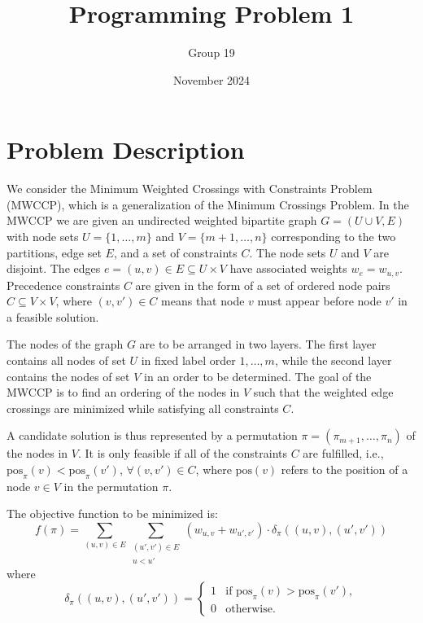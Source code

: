 \documentclass{article}
\title{Programming Problem 1}
\author{Group 19}
\date{November 2024}
\begin{document}
\maketitle

\section*{Problem Description}
We consider the Minimum Weighted Crossings with Constraints Problem (MWCCP), which is a generalization of the Minimum Crossings Problem. In the MWCCP we are given an undirected weighted bipartite graph \( G = (U \cup V, E) \) with node sets \( U = \{1, \dots, m\} \) and \( V = \{m + 1, \dots, n\} \) corresponding to the two partitions, edge set \( E \), and a set of constraints \( C \). The node sets \( U \) and \( V \) are disjoint. The edges \( e = (u, v) \in E \subseteq U \times V \) have associated weights \( w_e = w_{u,v} \). Precedence constraints \( C \) are given in the form of a set of ordered node pairs \( C \subseteq V \times V \), where \( (v, v') \in C \) means that node \( v \) must appear before node \( v' \) in a feasible solution.

The nodes of the graph \( G \) are to be arranged in two layers. The first layer contains all nodes of set \( U \) in fixed label order \( 1, \dots, m \), while the second layer contains the nodes of set \( V \) in an order to be determined. The goal of the MWCCP is to find an ordering of the nodes in \( V \) such that the weighted edge crossings are minimized while satisfying all constraints \( C \).

A candidate solution is thus represented by a permutation \( \pi = (\pi_{m+1}, \dots, \pi_n) \) of the nodes in \( V \). It is only feasible if all of the constraints \( C \) are fulfilled, i.e., \( \text{pos}_\pi(v) < \text{pos}_\pi(v') \), \( \forall (v, v') \in C \), where \( \text{pos}(v) \) refers to the position of a node \( v \in V \) in the permutation \( \pi \).

The objective function to be minimized is:
\[
f(\pi) = \sum_{(u, v) \in E} \sum_{\substack{(u', v') \in E \\ u < u'}} 
(w_{u,v} + w_{u', v'}) \cdot \delta_{\pi}((u, v), (u', v'))
\]
where
\[
\delta_{\pi}((u, v), (u', v')) = 
\begin{cases} 
1 & \text{if } \text{pos}_{\pi}(v) > \text{pos}_{\pi}(v'), \\ 
0 & \text{otherwise.} 
\end{cases}
\]
\end{document}
